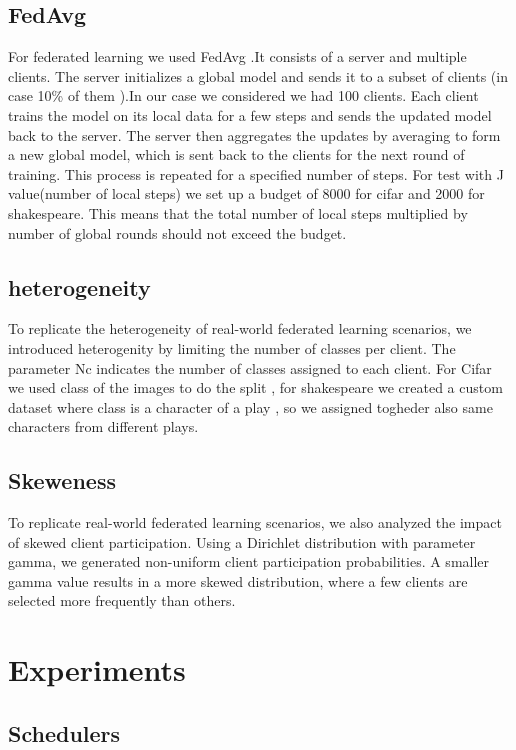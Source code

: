 \documentclass[10pt,twocolumn,letterpaper]{article}
\begin{document}
\subsection{FedAvg}
For federated learning we used FedAvg \cite{Paper10} .It consists of a server and multiple clients. The server initializes a global model and sends it to a subset of clients (in case 10\% of them ).In our case we considered we had 100 clients. Each client trains the model on its local data for a few steps and sends the updated model back to the server.
The server then aggregates the updates by averaging to form a new global model, which is sent back to the clients for the next round of training. This process is repeated for a specified number of steps.
For test with J value(number of local steps) we set up a budget of 8000 for cifar and 2000 for shakespeare. This means that the total number of local steps multiplied by number of  global rounds should not exceed the budget.

\subsection{heterogeneity}
To replicate the heterogeneity of real-world federated learning scenarios, we introduced heterogenity by limiting the number of classes per client.
The parameter Nc indicates the number of classes assigned to each client. For Cifar we used class of the images to do the split , for shakespeare we created a custom dataset where class is a character of a play , so we assigned togheder also same characters from different plays. 
\subsection{Skeweness}
To replicate real-world federated learning scenarios, we also analyzed the impact of skewed client participation.
Using a Dirichlet distribution with parameter gamma, we generated non-uniform client participation probabilities. A smaller gamma value results in a more skewed distribution, where a few clients are selected more frequently than others.

\section{Experiments}
\subsection{Schedulers}
\end{document}
